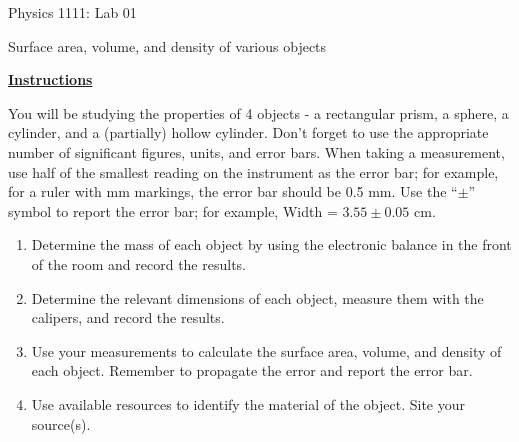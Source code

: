 \documentclass[12pt]{article}
\begin{document}
{\centering
\large Physics 1111: Lab 01 \par
\large Surface area, volume, and density of various objects \par
}
\hfill \break \vspace{-4mm}

\underline{\textbf{Instructions}} \par
You will be studying the properties of 4 objects - a rectangular prism, a sphere, a cylinder, and a (partially) hollow cylinder.
Don’t forget to use the appropriate number of significant figures, units, and error bars.
When taking a measurement, use half of the smallest reading on the instrument as the error bar;
for example, for a ruler with mm markings, the error bar should be 0.5 mm.
Use the ``$\pm$'' symbol to report the error bar; for example, Width = $3.55 \pm 0.05$ cm.
\begin{enumerate}
\item Determine the mass of each object by using the electronic balance in the front of the room and record the results.
\item Determine the relevant dimensions of each object, measure them with the calipers, and record the results. 
\item Use your measurements to calculate the surface area, volume, and density of each object. Remember to propagate the error and report the error bar.
\item Use available resources to identify the material of the object. Site your source(s).
\end{enumerate}
\end{document}

